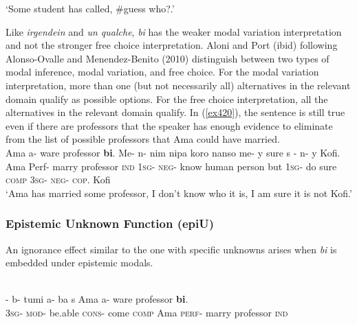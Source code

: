 \documentclass[output=paper,
modfonts
]{langsci/langscibook}
\begin{document}
\glt `Some student has called, \#guess who?.' 
\z \z

Like \emph{irgendein} and \emph{un qualche}, \emph{bi} has the weaker modal variation interpretation and not the stronger free choice interpretation. Aloni and Port (ibid) following Alonso-Ovalle and Menendez-Benito (2010) distinguish between two types of modal inference, modal variation, and free choice. 
For the modal variation interpretation, more than one (but not necessarily all) alternatives in the relevant domain qualify as possible options. For the free choice interpretation, all the alternatives in the relevant domain qualify. In (\ref{ex420}), the sentence is still true even if there are professors that the speaker has enough evidence to eliminate from the list of possible professors that Ama could have married.
\ea\label{ex420}\\
 \gll  Ama a- ware professor \textbf{bi}. Me- n- nim nipa koro nanso me- y sure s - n- y Kofi.\\
Ama Perf- marry professor \textsc{ind} \textsc{1sg}- \textsc{neg}- know human person but \textsc{1sg}- do sure \textsc{comp}  \textsc{3sg}- \textsc{neg}- \textsc{cop}. Kofi \\
    
\glt `Ama has married some professor, I don't know who it is, I am sure it is not Kofi.' 
\z 
\subsubsection{Epistemic Unknown Function (epiU)}
An ignorance effect similar to the one with specific unknowns arises when \emph{bi} is embedded under epistemic modals.

\ea\label{ex42}\\
 \gll  {}- b- tumi a- ba s Ama a- ware professor \textbf{bi}. 
\\
\textsc{3sg}- \textsc{mod}- be.able \textsc{cons}- come \textsc{comp} Ama \textsc{perf}- marry professor \textsc{ind} \\
    
\end{document}
